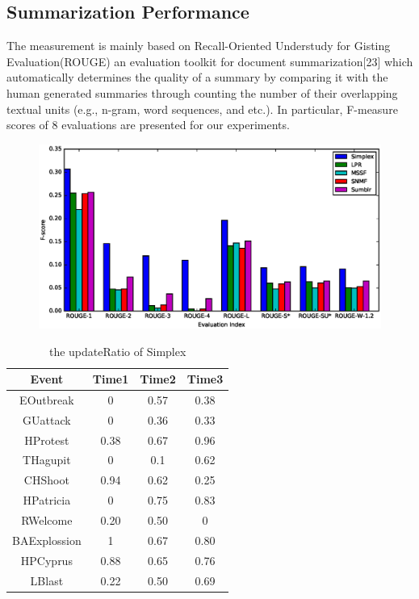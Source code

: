 \documentclass{llncs}
\begin{document}
\subsection{Summarization Performance}

The measurement is mainly based on Recall-Oriented Understudy for Gisting Evaluation(ROUGE) an evaluation toolkit for document summarization[23] which automatically determines the quality of a summary by comparing it with the human generated summaries through counting the number of their overlapping textual units (e.g., n-gram, word sequences, and etc.). In particular, F-measure scores of 8 evaluations are presented for our experiments.


\begin{figure}
    \centering
    \includegraphics[scale=0.6]{rouge.eps}

\end{figure}

\begin{table}[htp]\label{table:update 0f simplex}
\caption{the updateRatio of Simplex}
\begin{center}
\begin{tabular}{|c|c|c|c|}
    \hline
    Event & Time1 & Time2 & Time3 \\
    \hline
    EOutbreak & 0 & 0.57 & 0.38 \\
    \hline
    GUattack & 0 & 0.36 & 0.33 \\
    \hline
    HProtest & 0.38 & 0.67 & 0.96 \\
    \hline
    THagupit & 0 & 0.1 & 0.62\\
    \hline
    CHShoot & 0.94 & 0.62 & 0.25\\
    \hline
    HPatricia & 0 & 0.75 & 0.83\\
    \hline
    RWelcome & 0.20 & 0.50 & 0\\
    \hline
    BAExplossion & 1 & 0.67 & 0.80\\
    \hline
    HPCyprus & 0.88 & 0.65 & 0.76\\
    \hline
    LBlast & 0.22 & 0.50 & 0.69\\
    \hline
\end{tabular}
\end{center}
\label{default}
\end{table}
\end{document}
